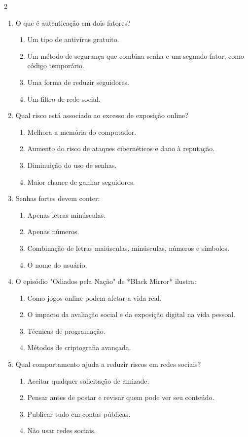 \documentclass[11pt]{article}
\begin{document}
\begin{multicols}{2}
\begin{enumerate}[leftmargin=*]
\item O que é autenticação em dois fatores?
\begin{enumerate}[label=\alph*)]
\item Um tipo de antivírus gratuito.
\item Um método de segurança que combina senha e um segundo fator, como código temporário.
\item Uma forma de reduzir seguidores.
\item Um filtro de rede social.
\end{enumerate}

\item Qual risco está associado ao excesso de exposição online?
\begin{enumerate}[label=\alph*)]
\item Melhora a memória do computador.
\item Aumento do risco de ataques cibernéticos e dano à reputação.
\item Diminuição do uso de senhas.
\item Maior chance de ganhar seguidores.
\end{enumerate}

\item Senhas fortes devem conter:
\begin{enumerate}[label=\alph*)]
\item Apenas letras minúsculas.
\item Apenas números.
\item Combinação de letras maiúsculas, minúsculas, números e símbolos.
\item O nome do usuário.
\end{enumerate}

\item O episódio "Odiados pela Nação" de *Black Mirror* ilustra:
\begin{enumerate}[label=\alph*)]
\item Como jogos online podem afetar a vida real.
\item O impacto da avaliação social e da exposição digital na vida pessoal.
\item Técnicas de programação.
\item Métodos de criptografia avançada.
\end{enumerate}

\item Qual comportamento ajuda a reduzir riscos em redes sociais?
\begin{enumerate}[label=\alph*)]
\item Aceitar qualquer solicitação de amizade.
\item Pensar antes de postar e revisar quem pode ver seu conteúdo.
\item Publicar tudo em contas públicas.
\item Não usar redes sociais.
\end{enumerate}


\end{enumerate}
\end{multicols}
\end{document}
